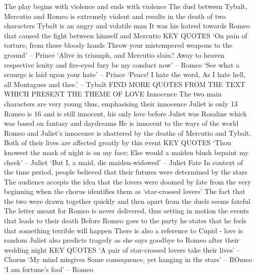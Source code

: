 \documentclass{article}
\begin{document}
\begin{outline}
\2 The play begins with violence and ends with violence
\2 The duel between Tybalt, Mercutio and Romeo is extremely violent and results in the death of two characters
\2 Tybalt is an angry and volatile man
\2 It was his hatred towards Romeo that caused the fight between himself and Mercutio
\2 KEY QUOTES
\3 `On pain of torture, from those bloody hands Throw your mistempered weapons to the ground' -- Prince
\3 `Alive in triumph, and Mercutio slain? Away to heaven respective lenity and fire-eyed fury be my conduct now' -- Romeo
\3 `See what a scourge is laid upon your hate' -- Prince
\3 `Peace! I hate the word, As I hate hell, all Montagues and thee.' -- Tybalt
\3 FIND MORE QUOTES FROM THE TEXT WHICH PRESENT THE THEME OF LOVE
\4 
\1 Innocence
\2 The two main characters are very young thus, emphasising their innocence
\2 Juliet is only 13
\2 Romeo is 16 and is still innocent, his only love before Juliet was Rosaline which was based on fantasy and daydreams
\2 He is innocent to the ways of the world
\2 Romeo and Juliet's innocence is shattered by the deaths of Mercutio and Tybalt. Both of their lives are affected greatly by this event
\2 KEY QUOTES
\3 `Thou knowest the mask of night is on my face; Else would a maiden blush bepaint my cheek' -- Juliet
\3 `But I, a maid, die maiden-widowed' -- Juliet
\1 Fate
\2 In context of the time period, people believed that their futures were determined by the stars
\2 The audience accepts the idea that the lovers were doomed by fate from the very beginning when the chorus identifies them as `star-crossed lovers'
\2 The fact that the two were drawn together quickly and then apart from the duels seems fateful
\2 The letter meant for Romeo is never delivered, thus setting in motion the events that leads to their death
\2 Before Romeo goes to the party he states that he feels that something terrible will happen
\2 There is also a reference to Cupid - love is random
\2 Juliet also predicts tragedy as she says goodbye to Romeo after their wedding night
\2 KEY QUOTES
\3 `A pair of star-crossed lovers take their lives' -- Chorus
\3 `My mind misgives Some consequence, yet hanging in the stars' -- ROmeo
\3 `I am fortune's fool' -- Romeo
\end{outline}
\end{document}
